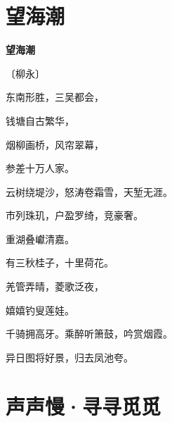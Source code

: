 \documentclass[12pt,UTF-8,openany,fontset=none]{ctexbook}
\begin{document}
\vspace{8pt}
\clearpage

\section{望海潮}


\begin{center}
    {\bfseries 望海潮}

    \vspace{18pt}

    \begin{large}\xuwen
        〔柳永〕
    \end{large}

\end{center}

    \vspace{18pt}  %

\begin{center}
    \begin{Large}

        东南形胜，三吴都会，

        钱塘自古繁华，

        烟柳画桥，风帘翠幕，

        参差十万人家。

        云树绕堤沙，怒涛卷霜雪，天堑无涯。

        市列珠玑，户盈罗绮，竞豪奢。

        \vspace{18pt}  %

        重湖叠巘清嘉。

        有三秋桂子，十里荷花。

        羌管弄晴，菱歌泛夜，

        嬉嬉钓叟莲娃。

        千骑拥高牙。乘醉听箫鼓，吟赏烟霞。

        异日图将好景，归去凤池夸。

    \end{Large}

\end{center}

\vspace{8pt}
\clearpage

\section{声声慢·寻寻觅觅}
\end{document}
